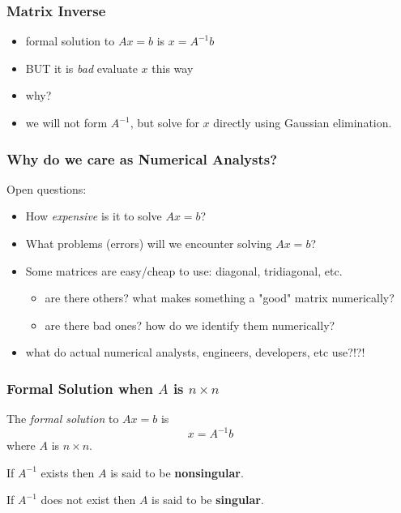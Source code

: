 \documentclass[10pt]{beamer}
\newcommand{\matdim}[2]{\ensuremath{#1\times#2}}
\begin{document}
\begin{frame}
\frametitle{Matrix Inverse}

\begin{itemize}
\item<1-> formal solution to $Ax=b$ is $x=A^{-1}b$
\item<2-> BUT it is \emph{bad} evaluate $x$ this way
\item<3-> why?
\item<4-> we will not form $A^{-1}$, but solve for $x$ directly using
Gaussian elimination.
\end{itemize}
\end{frame}
\begin{frame}
\frametitle{Why do we care as Numerical Analysts?}

Open questions:
\begin{itemize}
  \item How \emph{expensive} is it to solve $Ax=b$?
  \item What problems (errors) will we encounter solving $Ax=b$?
  \item Some matrices are easy/cheap to use: diagonal, tridiagonal, etc.
    \begin{itemize}
      \item are there others?  what makes something a "good" matrix
      numerically?
      \item are there bad ones?  how do we identify them numerically?
    \end{itemize}
  \item what do actual numerical analysts, engineers, developers, etc
  use?!?!
\end{itemize}

\end{frame}
\begin{frame}
\frametitle{Formal Solution when $A$ is \matdim{n}{n}}


The \emph{formal solution} to $Ax=b$ is
\begin{equation*}
        x = A^{-1}b
\end{equation*}
where $A$ is \matdim{n}{n}.

If $A^{-1}$ exists then $A$ is said to be \textbf{nonsingular}.

If $A^{-1}$ does not exist then $A$ is said to be \textbf{singular}.

\end{frame}
\end{document}
